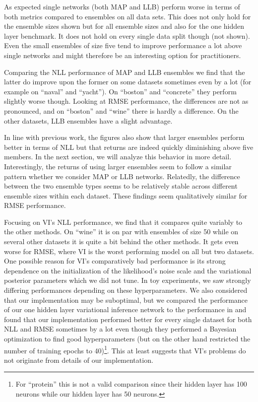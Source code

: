 \documentclass[../thesis.tex]{subfiles}
\begin{document}
As expected single networks (both MAP and LLB) perform worse in terms of both metrics compared to ensembles on all data sets. This does not only hold for the ensemble sizes shown but for all ensemble sizes and also for the one hidden layer benchmark. It does not hold on every single data split though (not shown). Even the small ensembles of size five tend to improve performance a lot above single networks and might therefore be an interesting option for practitioners.

Comparing the NLL performance of MAP and LLB ensembles we find that the latter do improve upon the former on some datasets sometimes even by a lot (for example on ``naval'' and ``yacht''). On ``boston'' and ``concrete'' they perform slightly worse though. Looking at RMSE performance, the differences are not as pronounced, and on ``boston'' and ``wine'' there is hardly a difference. On the other datasets, LLB ensembles have a slight advantage.

In line with previous work, the figures also show that larger ensembles perform better in terms of NLL but that returns are indeed quickly diminishing above five members. In the next section, we will analyze this behavior in more detail. Interestingly, the returns of using larger ensembles seem to follow a similar pattern whether we consider MAP or LLB networks. Relatedly, the difference between the two ensemble types seems to be relatively stable across different ensemble sizes within each dataset. These findings seem qualitatively similar for RMSE performance.

Focusing on VI's NLL performance, we find that it compares quite variably to the other methods. On ``wine'' it is on par with ensembles of size 50 while on several other datasets it is quite a bit behind the other methods. It gets even worse for RMSE, where VI is the worst performing model on all but two datasets. One possible reason for VI's comparatively bad performance is its strong dependence on the initialization of the likelihood's noise scale and the variational posterior parameters which we did not tune. In toy experiments, we saw strongly differing performances depending on these hyperparameters. We also considered that our implementation may be suboptimal, but we compared the performance of our one hidden layer variational inference network to the performance in \textcite{hernandez2015probabilistic} and found that our implementation performed better for every single dataset for both NLL and RMSE sometimes by a lot even though they performed a Bayesian optimization to find good hyperparameters (but on the other hand restricted the number of training epochs to 40)\footnote{For ``protein'' this is not a valid comparison since their hidden layer has 100 neurons while our hidden layer has 50 neurons.}. This at least suggests that VI's problems do not originate from details of our implementation.
\end{document}

